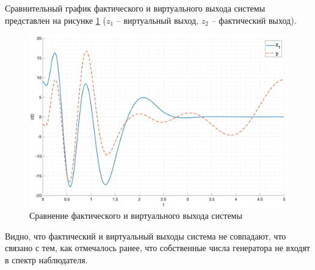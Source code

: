 Сравнительный график фактического и виртуального выхода системы представлен на рисунке \ref{fig:task3_z1_cmp} ($z_1$ -- виртуальный выход, $z_2$ -- фактический выход).
\begin{figure}[ht!]
    \centering
    \includegraphics[width=\textwidth]{media/plots/task3_z1_cmp.png}
    \caption{Сравнение фактического и виртуального выхода системы}
    \label{fig:task3_z1_cmp}
\end{figure}
Видно, что фактический и виртуальный выходы система не совпадают, что связано с тем, как отмечалось 
ранее, что собственные числа генератора не входят в спектр наблюдателя. 

